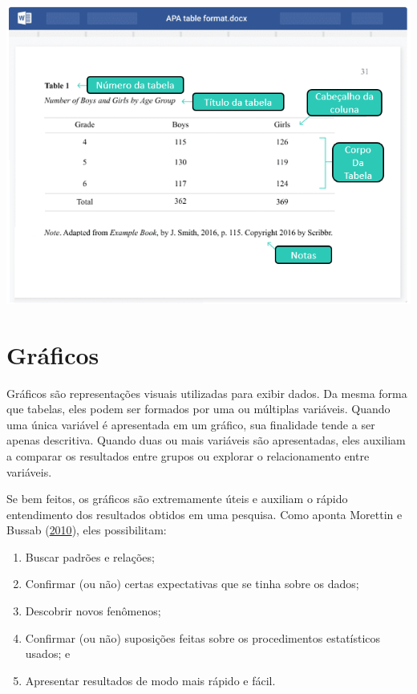 \documentclass[
]{book}
\providecommand{\tightlist}{%
  \setlength{\itemsep}{0pt}\setlength{\parskip}{0pt}}
\begin{document}
\includegraphics{./img/cap_desc_tabela.png}

\hypertarget{gruxe1ficos}{%
\section{Gráficos}\label{gruxe1ficos}}

Gráficos são representações visuais utilizadas para exibir dados. Da
mesma forma que tabelas, eles podem ser formados por uma ou múltiplas
variáveis. Quando uma única variável é apresentada em um gráfico, sua
finalidade tende a ser apenas descritiva. Quando duas ou mais variáveis
são apresentadas, eles auxiliam a comparar os resultados entre grupos ou
explorar o relacionamento entre variáveis.

Se bem feitos, os gráficos são extremamente úteis e auxiliam o rápido
entendimento dos resultados obtidos em uma pesquisa. Como aponta
Morettin e Bussab (\protect\hyperlink{ref-morettin_bussab_2010}{2010}),
eles possibilitam:

\begin{enumerate}
\def\labelenumi{(\alph{enumi})}
\tightlist
\item
  Buscar padrões e relações;\\
\item
  Confirmar (ou não) certas expectativas que se tinha sobre os dados;\\
\item
  Descobrir novos fenômenos;\\
\item
  Confirmar (ou não) suposições feitas sobre os procedimentos
  estatísticos usados; e\\
\item
  Apresentar resultados de modo mais rápido e fácil.
\end{enumerate}
\end{document}
